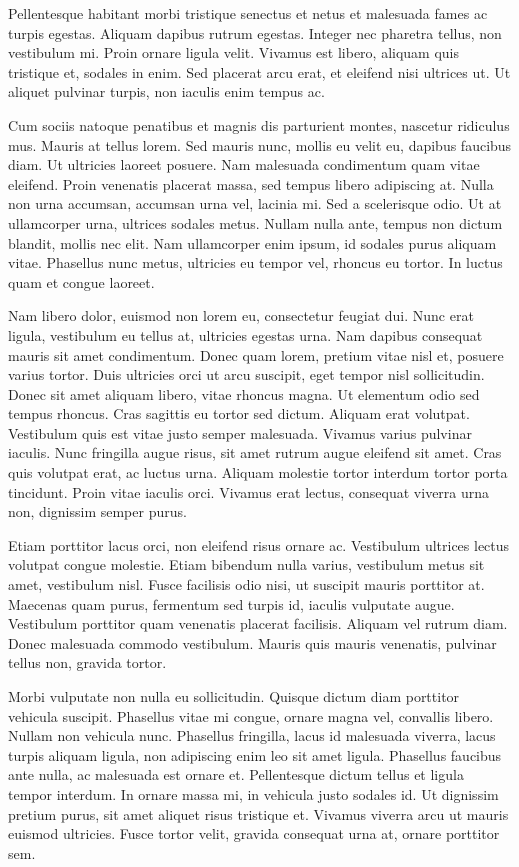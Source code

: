\documentclass[9pt]{memoir}
\begin{document}
Pellentesque habitant morbi tristique senectus et netus et malesuada fames ac turpis egestas. Aliquam dapibus rutrum egestas. Integer nec pharetra tellus, non vestibulum mi. Proin ornare ligula velit. Vivamus est libero, aliquam quis tristique et, sodales in enim. Sed placerat arcu erat, et eleifend nisi ultrices ut. Ut aliquet pulvinar turpis, non iaculis enim tempus ac.

Cum sociis natoque penatibus et magnis dis parturient montes, nascetur ridiculus mus. Mauris at tellus lorem. Sed mauris nunc, mollis eu velit eu, dapibus faucibus diam. Ut ultricies laoreet posuere. Nam malesuada condimentum quam vitae eleifend. Proin venenatis placerat massa, sed tempus libero adipiscing at. Nulla non urna accumsan, accumsan urna vel, lacinia mi. Sed a scelerisque odio. Ut at ullamcorper urna, ultrices sodales metus. Nullam nulla ante, tempus non dictum blandit, mollis nec elit. Nam ullamcorper enim ipsum, id sodales purus aliquam vitae. Phasellus nunc metus, ultricies eu tempor vel, rhoncus eu tortor. In luctus quam et congue laoreet.

Nam libero dolor, euismod non lorem eu, consectetur feugiat dui. Nunc erat ligula, vestibulum eu tellus at, ultricies egestas urna. Nam dapibus consequat mauris sit amet condimentum. Donec quam lorem, pretium vitae nisl et, posuere varius tortor. Duis ultricies orci ut arcu suscipit, eget tempor nisl sollicitudin. Donec sit amet aliquam libero, vitae rhoncus magna. Ut elementum odio sed tempus rhoncus. Cras sagittis eu tortor sed dictum. Aliquam erat volutpat. Vestibulum quis est vitae justo semper malesuada. Vivamus varius pulvinar iaculis. Nunc fringilla augue risus, sit amet rutrum augue eleifend sit amet. Cras quis volutpat erat, ac luctus urna. Aliquam molestie tortor interdum tortor porta tincidunt. Proin vitae iaculis orci. Vivamus erat lectus, consequat viverra urna non, dignissim semper purus.

Etiam porttitor lacus orci, non eleifend risus ornare ac. Vestibulum ultrices lectus volutpat congue molestie. Etiam bibendum nulla varius, vestibulum metus sit amet, vestibulum nisl. Fusce facilisis odio nisi, ut suscipit mauris porttitor at. Maecenas quam purus, fermentum sed turpis id, iaculis vulputate augue. Vestibulum porttitor quam venenatis placerat facilisis. Aliquam vel rutrum diam. Donec malesuada commodo vestibulum. Mauris quis mauris venenatis, pulvinar tellus non, gravida tortor.

Morbi vulputate non nulla eu sollicitudin. Quisque dictum diam porttitor vehicula suscipit. Phasellus vitae mi congue, ornare magna vel, convallis libero. Nullam non vehicula nunc. Phasellus fringilla, lacus id malesuada viverra, lacus turpis aliquam ligula, non adipiscing enim leo sit amet ligula. Phasellus faucibus ante nulla, ac malesuada est ornare et. Pellentesque dictum tellus et ligula tempor interdum. In ornare massa mi, in vehicula justo sodales id. Ut dignissim pretium purus, sit amet aliquet risus tristique et. Vivamus viverra arcu ut mauris euismod ultricies. Fusce tortor velit, gravida consequat urna at, ornare porttitor sem.
\end{document}
